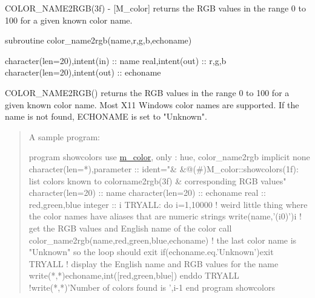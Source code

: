 \begin{DoxyDescription}
\item[\label{_COLOR_NAME2RGB}%
N\+A\+ME ]C\+O\+L\+O\+R\+\_\+\+N\+A\+M\+E2\+R\+G\+B(3f) -\/ \mbox{[}M\+\_\+color\mbox{]} returns the R\+GB values in the range 0 to 100 for a given known color name. 


\item[S\+Y\+N\+O\+P\+S\+IS ]
\begin{DoxyPre}
    subroutine color\_name2rgb(name,r,g,b,echoname)\end{DoxyPre}



\begin{DoxyPre}     character(len=20),intent(in)   :: name
     real,intent(out)               :: r,g,b
     character(len=20),intent(out)  :: echoname
    \end{DoxyPre}
 


\item[D\+E\+S\+C\+R\+I\+P\+T\+I\+ON ]\begin{DoxyVerb}COLOR_NAME2RGB() returns the RGB values in the range 0 to 100 for a given known color name.
Most X11 Windows color names are supported. If the name is not found, ECHONAME is set to
"Unknown".
\end{DoxyVerb}
 


\item[E\+X\+A\+M\+P\+LE ]\begin{quote}
A sample program\+: 
\begin{DoxyPre}
       program showcolors
       use \hyperlink{namespacem__color}{m\_color}, only : hue, color\_name2rgb
       implicit none
       character(len=*),parameter :: ident="&
       &@(#)M\_color::showcolors(1f): list colors known to colorname2rgb(3f) & corresponding RGB values"
       character(len=20) :: name
       character(len=20) :: echoname
       real              :: red,green,blue
       integer           :: i
       TRYALL: do i=1,10000
          ! weird little thing where the color names have aliases that are numeric strings
          write(name,'(i0)')i
          ! get the RGB values and English name of the color
          call color\_name2rgb(name,red,green,blue,echoname)
          ! the last color name is "Unknown" so the loop should exit
          if(echoname.eq.'Unknown')exit TRYALL
          ! display the English name and RGB values for the name
          write(*,*)echoname,int([red,green,blue])
       enddo TRYALL
       !write(*,*)'Number of colors found is ',i-1
       end program showcolors
 \end{DoxyPre}
 \end{quote}



\end{DoxyDescription}

